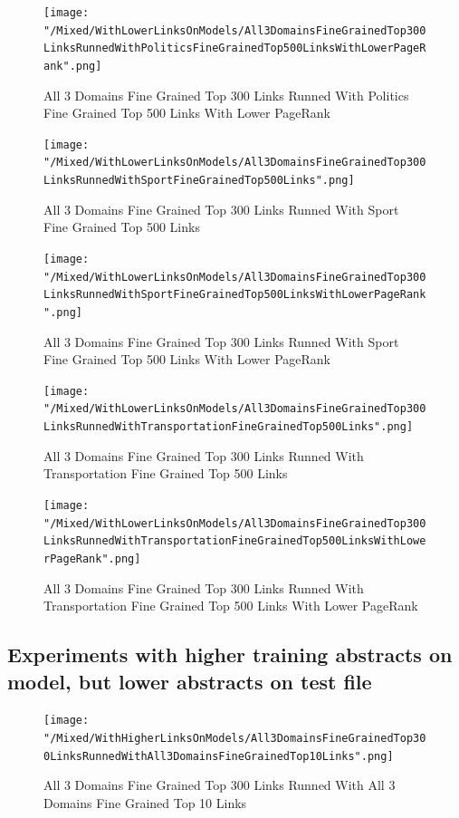 \documentclass[thesis=M,english]{FITthesis}[2018/05/30]
\begin{document}
	\begin{figure}[H]\centering
		\texttt{[image: "/Mixed/WithLowerLinksOnModels/All3DomainsFineGrainedTop300LinksRunnedWithPoliticsFineGrainedTop500LinksWithLowerPageRank".png]}
		\caption{All 3 Domains Fine Grained Top 300 Links Runned With Politics Fine Grained Top 500 Links With Lower PageRank}\label{}
	\end{figure}
	
	\begin{figure}[H]\centering
		\texttt{[image: "/Mixed/WithLowerLinksOnModels/All3DomainsFineGrainedTop300LinksRunnedWithSportFineGrainedTop500Links".png]}
		\caption{All 3 Domains Fine Grained Top 300 Links Runned With Sport Fine Grained Top 500 Links}\label{}
	\end{figure}
	
	\begin{figure}[H]\centering
		\texttt{[image: "/Mixed/WithLowerLinksOnModels/All3DomainsFineGrainedTop300LinksRunnedWithSportFineGrainedTop500LinksWithLowerPageRank".png]}
		\caption{All 3 Domains Fine Grained Top 300 Links Runned With Sport Fine Grained Top 500 Links With Lower PageRank}\label{}
	\end{figure}
	
	\begin{figure}[H]\centering
		\texttt{[image: "/Mixed/WithLowerLinksOnModels/All3DomainsFineGrainedTop300LinksRunnedWithTransportationFineGrainedTop500Links".png]}
		\caption{All 3 Domains Fine Grained Top 300 Links Runned With Transportation Fine Grained Top 500 Links}\label{}
	\end{figure}
	
	\begin{figure}[H]\centering
		\texttt{[image: "/Mixed/WithLowerLinksOnModels/All3DomainsFineGrainedTop300LinksRunnedWithTransportationFineGrainedTop500LinksWithLowerPageRank".png]}
		\caption{All 3 Domains Fine Grained Top 300 Links Runned With Transportation Fine Grained Top 500 Links With Lower PageRank}\label{}
	\end{figure}

\subsection{Experiments with higher training abstracts on model, but lower abstracts on test file}	
	\begin{figure}[H]\centering
		\texttt{[image: "/Mixed/WithHigherLinksOnModels/All3DomainsFineGrainedTop300LinksRunnedWithAll3DomainsFineGrainedTop10Links".png]}
		\caption{All 3 Domains Fine Grained Top 300 Links Runned With All 3 Domains Fine Grained Top 10 Links}\label{}
	\end{figure}
	
\end{document}
